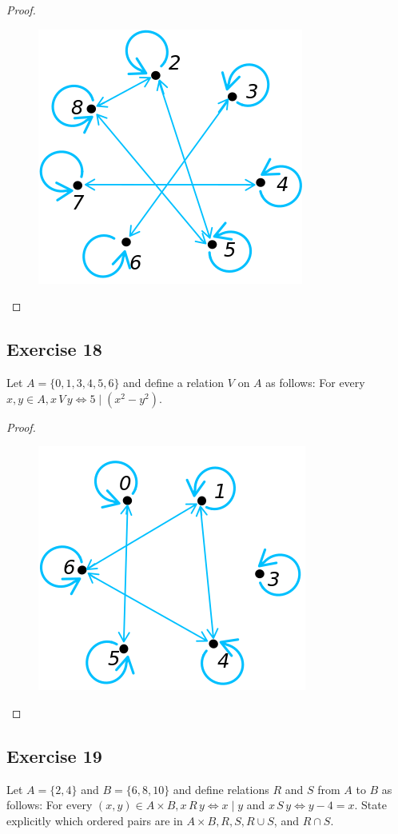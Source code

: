\documentclass[14pt]{extarticle}
\begin{document}
\begin{proof}
\begin{figure}[ht!]
\centering
\includegraphics[scale=0.4]{../images/8.1.17.png}
\end{figure}
\end{proof}

\subsection{Exercise 18}
Let \(A = \{0, 1, 3, 4, 5, 6\}\) and define a relation $V$ on $A$ as follows: For every \(x, y \in A, x \, V \, y \iff 
5 \mid (x^2 - y^2)\).

\begin{proof}
\begin{figure}[ht!]
\centering
\includegraphics[scale=0.4]{../images/8.1.18.png}
\end{figure}
\end{proof}

\subsection{Exercise 19}
Let \(A = \{2, 4\}\) and \(B = \{6, 8, 10\}\) and define relations $R$ and $S$ from $A$ to $B$ as follows: For every 
\((x, y) \in A \times B, x \, R \, y \iff x \mid y\) and \( x \, S \, y \iff y - 4 = x\). State explicitly which 
ordered pairs are in \(A \times B, R, S, R \cup S\), and \(R \cap S\).
\end{document}
